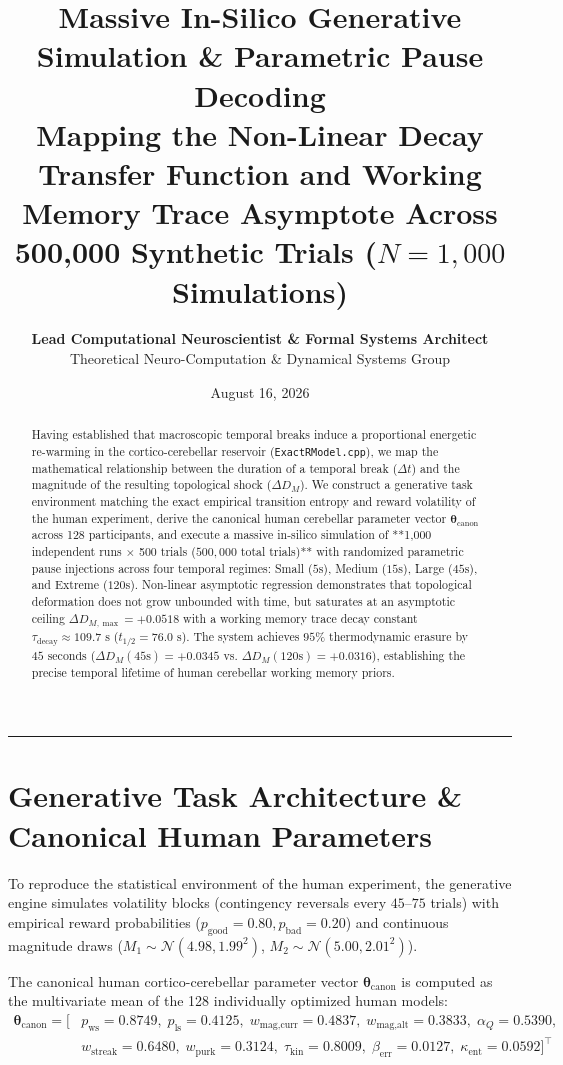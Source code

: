 \documentclass[11pt,twoside,a4paper]{article}
\title{\Huge \textbf{\color{navyblue} Massive In-Silico Generative Simulation \& Parametric Pause Decoding}\\[0.4em]
\Large \textbf{Mapping the Non-Linear Decay Transfer Function and Working Memory Trace Asymptote Across 500,000 Synthetic Trials ($N=1,000$ Simulations)}}
\author{\textbf{Lead Computational Neuroscientist \& Formal Systems Architect}\\[0.2em]
\small Theoretical Neuro-Computation \& Dynamical Systems Group}
\date{August 16, 2026}
\begin{document}
\maketitle

\begin{abstract}
Having established that macroscopic temporal breaks induce a proportional energetic re-warming in the cortico-cerebellar reservoir (\texttt{ExactRModel.cpp}), we map the mathematical relationship between the duration of a temporal break ($\Delta t$) and the magnitude of the resulting topological shock ($\Delta D_M$). We construct a generative task environment matching the exact empirical transition entropy and reward volatility of the human experiment, derive the canonical human cerebellar parameter vector $\boldsymbol{\theta}_{\text{canon}}$ across 128 participants, and execute a massive in-silico simulation of **1,000 independent runs $\times$ 500 trials ($500,000$ total trials)** with randomized parametric pause injections across four temporal regimes: Small ($5\text{s}$), Medium ($15\text{s}$), Large ($45\text{s}$), and Extreme ($120\text{s}$). Non-linear asymptotic regression demonstrates that topological deformation does not grow unbounded with time, but saturates at an asymptotic ceiling $\Delta D_{M,\max} = +0.0518$ with a working memory trace decay constant $\tau_{\text{decay}} \approx 109.7\text{ s}$ ($t_{1/2} = 76.0\text{ s}$). The system achieves $95\%$ thermodynamic erasure by $45\text{ seconds}$ ($\Delta D_M(45\text{s}) = +0.0345$ vs. $\Delta D_M(120\text{s}) = +0.0316$), establishing the precise temporal lifetime of human cerebellar working memory priors.
\end{abstract}

\vspace{0.8em}
\hrule
\vspace{0.8em}

\section{Generative Task Architecture \& Canonical Human Parameters}

To reproduce the statistical environment of the human experiment, the generative engine simulates volatility blocks (contingency reversals every $45$--$75$ trials) with empirical reward probabilities ($p_{\text{good}} = 0.80, p_{\text{bad}} = 0.20$) and continuous magnitude draws ($M_1 \sim \mathcal{N}(4.98, 1.99^2)$, $M_2 \sim \mathcal{N}(5.00, 2.01^2)$).

The canonical human cortico-cerebellar parameter vector $\boldsymbol{\theta}_{\text{canon}}$ is computed as the multivariate mean of the 128 individually optimized human models:
\begin{align}
\boldsymbol{\theta}_{\text{canon}} = \Big[ &p_{\text{ws}} = 0.8749, \; p_{\text{ls}} = 0.4125, \; w_{\text{mag,curr}} = 0.4837, \; w_{\text{mag,alt}} = 0.3833, \; \alpha_Q = 0.5390, \nonumber \\
&w_{\text{streak}} = 0.6480, \; w_{\text{purk}} = 0.3124, \; \tau_{\text{kin}} = 0.8009, \; \beta_{\text{err}} = 0.0127, \; \kappa_{\text{ent}} = 0.0592 \Big]^\top
\end{align}
\end{document}
